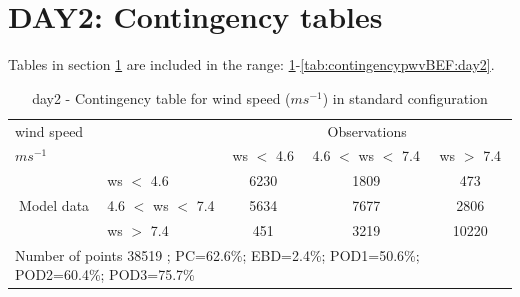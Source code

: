 \section{DAY2: Contingency tables}\label{sec:day2:cont}
Tables in section \ref{sec:day2:cont} are included in the range: \ref{tab:contingencywsBEF:day2}-\ref{tab:contingencypwvBEF:day2}.
\begin{table}[h!]
\begin{center}
\begin{tabular}{llccc}
\hline
{wind speed}                                       &                                                    & \multicolumn{3}{c}{Observations}                 \\
{$m s^{-1}$}                                       &                             & ws $<$ 4.6   & 4.6 $<$ ws $<$ 7.4 & ws $>$ 7.4 \\
\hline
\multicolumn{1}{c}{\multirow{3}{*}{Model data}}  & ws $<$ 4.6             & 6230                & 1809                       & 473              \\
                                                 & 4.6  $<$ ws $<$ 7.4 & 5634                & 7677                       & 2806              \\
                                                 & ws $>$ 7.4             & 451                & 3219                       & 10220              \\
\hline 
\multicolumn{5}{l}{ Number of points        38519 ; PC=62.6\%; EBD=2.4\%; POD1=50.6\%; POD2=60.4\%; POD3=75.7\%}                 \\
\end{tabular}
\end{center}
\caption{day2 - Contingency table for {wind speed} ($m s^{-1}$) in standard configuration}
\label{tab:contingencywsBEF:day2}
\end{table}
